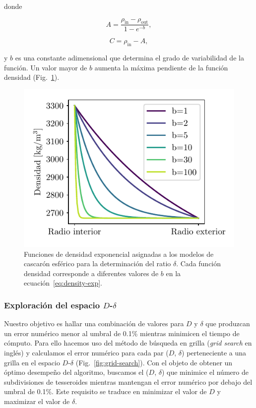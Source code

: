 \noindent donde

\begin{equation}
    A = \frac{\rho_\text{in} - \rho_\text{out}}{1 - e^{-b}},
\end{equation}

\begin{equation}
    C = \rho_\text{in} - A,
\end{equation}

\noindent y $b$ es una constante adimensional que determina el grado de
variabilidad de la función. Un valor mayor de $b$ aumenta la máxima pendiente
de la función densidad (Fig.~\ref{fig:exp-densities}).

\begin{figure}
\centering
\includegraphics[width=0.5\linewidth]{figs/tesseroids-variable-density/exponential-densities.pdf}
\caption{
    Funciones de densidad exponencial asignadas a los modelos de cascarón
    esférico para la determinación del ratio $\delta$.
    Cada función densidad corresponde a diferentes valores de $b$ en la
    ecuación~\ref{eq:density-exp}.
}
\label{fig:exp-densities}
\end{figure}


\subsubsection{Exploración del espacio $D$-$\delta$}

Nuestro objetivo es hallar una combinación de valores para $D$ y $\delta$ que
produzcan un error numérico menor al umbral de 0.1\% mientras minimicen el
tiempo de cómputo.
Para ello hacemos uso del método de búsqueda en grilla (\emph{grid search} en
inglés) y calculamos el error numérico para cada par ($D$, $\delta$)
perteneciente a una grilla en el espacio $D$-$\delta$
(Fig.~\ref{fig:grid-search}).
Con el objeto de obtener un óptimo desempeño del algoritmo, buscamos el ($D$,
$\delta$) que minimice el número de subdivisiones de tesseroides mientras
mantengan el error numérico por debajo del umbral de 0.1\%.
Este requisito se traduce en minimizar el valor de $D$ y maximizar el valor de
$\delta$.

